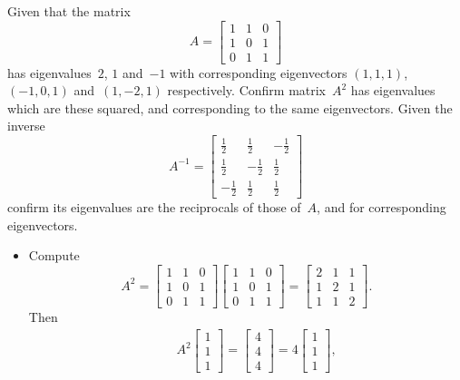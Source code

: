 \begin{example} \label{eg:3x3sympow}
Given that the matrix 
\begin{equation*}
A=\begin{bmatrix} 1&1&0\\1&0&1\\0&1&1 \end{bmatrix}
\end{equation*}
has eigenvalues~\(2\), \(1\) and~\(-1\) with corresponding eigenvectors \((1,1,1)\), \((-1,0,1)\) and~\((1,-2,1)\) respectively.
Confirm matrix~\(A^2\) has eigenvalues which are these squared, and corresponding to the same eigenvectors.
Given the inverse
\begin{equation*}
A^{-1}=\begin{bmatrix} \tfrac12&\tfrac12&-\tfrac12
\\\tfrac12&-\tfrac12&\tfrac12
\\-\tfrac12&\tfrac12&\tfrac12 \end{bmatrix}
\end{equation*}
confirm its eigenvalues are the reciprocals of those of~\(A\), and for corresponding eigenvectors.
\begin{solution} 
\begin{itemize}
\item Compute
\begin{equation*}
A^2=\begin{bmatrix} 1&1&0\\1&0&1\\0&1&1 \end{bmatrix}
\begin{bmatrix} 1&1&0\\1&0&1\\0&1&1 \end{bmatrix}
=\begin{bmatrix} 2&1&1\\1&2&1\\1&1&2 \end{bmatrix}.
\end{equation*}
Then
\begin{eqnarray*}
&&A^2\begin{bmatrix} 1\\1\\1 \end{bmatrix}
=\begin{bmatrix} 4\\4\\4 \end{bmatrix}
=4\begin{bmatrix} 1\\1\\1 \end{bmatrix},

\end{eqnarray*}
\end{itemize}
\end{solution}
\end{example}
